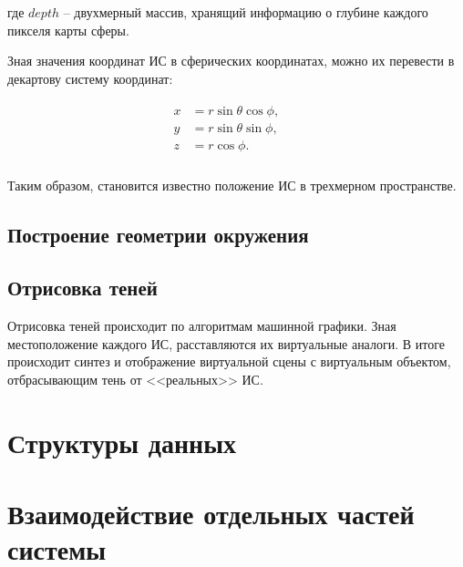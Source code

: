 где $depth$ -- двухмерный массив, хранящий информацию о глубине каждого пикселя карты сферы.

Зная значения координат ИС в сферических координатах, можно их перевести в декартову систему координат:

\begin{equation}
	\begin{aligned}
		\begin{split}
			x &= r \sin\theta \cos\phi, &&\\
			y &= r \sin\theta \sin\phi, &&\\
			z &= r \cos\phi. &&\\
		\end{split}
	\end{aligned}
\end{equation}

Таким образом, становится известно положение ИС в трехмерном пространстве.

\subsection{Построение геометрии окружения}



\subsection{Отрисовка теней}

Отрисовка теней происходит по алгоритмам машинной графики. Зная местоположение каждого ИС, расставляются их виртуальные аналоги. В итоге происходит синтез и отображение виртуальной сцены с виртуальным объектом, отбрасывающим тень от <<реальных>> ИС.

\section{Структуры данных}



\section{Взаимодействие отдельных частей системы}

